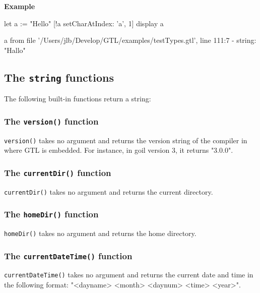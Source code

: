 \documentclass[10pt,openright,twosides]{report}
\newcommand{\scst}[1]{{\footnotesize\ttfamily\colorbox{light-blue}{"#1"}}}
\newcommand{\gtlinline}[1]{\colorbox{light-blue}{\lstinline[language=gtl]{#1}}}
\newcommand{\example}{\vspace{.75em}\noindent\textbf{Example}\vspace{0em}}
\begin{document}
\example
\begin{gtl}
let a := "Hello"
[!a setCharAtIndex: 'a', 1]
display a
\end{gtl}
\begin{console}
a from file '/Users/jlb/Develop/GTL/examples/testTypes.gtl', line 111:7
  - string: "Hallo"
\end{console}

\subsection{The \texttt{string} functions}

The following built-in functions return a string:

\subsubsection{The \texttt{version()} function}

\gtlinline{version()} takes no argument and returns the version string of the compiler in where GTL is embedded. For instance, in goil version 3, it returns \scst{3.0.0}.

\subsubsection{The \texttt{currentDir()} function}

\gtlinline{currentDir()} takes no argument and returns the current directory.

\subsubsection{The \texttt{homeDir()} function}

\gtlinline{homeDir()} takes no argument and returns the home directory.

\subsubsection{The \texttt{currentDateTime()} function}

\gtlinline{currentDateTime()} takes no argument and returns the current date and time in the following format: \scst{<dayname> <month> <daynum> <time> <year>}.
\end{document}
